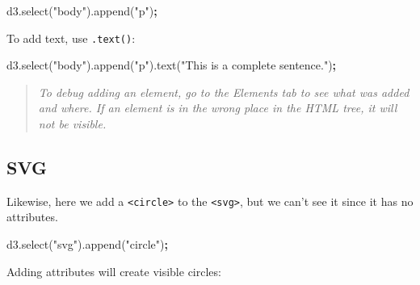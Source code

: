 \documentclass[openany]{book}
\newenvironment{Shaded}{\begin{snugshade}}{\end{snugshade}}
\newcommand{\AttributeTok}[1]{\textcolor[rgb]{0.77,0.63,0.00}{#1}}
\newcommand{\NormalTok}[1]{#1}
\newcommand{\OperatorTok}[1]{\textcolor[rgb]{0.81,0.36,0.00}{\textbf{#1}}}
\newcommand{\StringTok}[1]{\textcolor[rgb]{0.31,0.60,0.02}{#1}}
\newcommand{\VariableTok}[1]{\textcolor[rgb]{0.00,0.00,0.00}{#1}}
\begin{document}
\begin{Shaded}
\begin{Highlighting}[]
\VariableTok{d3}\NormalTok{.}\AttributeTok{select}\NormalTok{(}\StringTok{"body"}\NormalTok{).}\AttributeTok{append}\NormalTok{(}\StringTok{"p"}\NormalTok{)}\OperatorTok{;}
\end{Highlighting}
\end{Shaded}

To add text, use \texttt{.text()}:

\begin{Shaded}
\begin{Highlighting}[]
\VariableTok{d3}\NormalTok{.}\AttributeTok{select}\NormalTok{(}\StringTok{"body"}\NormalTok{).}\AttributeTok{append}\NormalTok{(}\StringTok{"p"}\NormalTok{).}\AttributeTok{text}\NormalTok{(}\StringTok{"This is a complete sentence."}\NormalTok{)}\OperatorTok{;}
\end{Highlighting}
\end{Shaded}

\begin{quote}
 \emph{To debug adding an element, go to the Elements tab to see what was added and where. If an element is in the wrong place in the HTML tree, it will not be visible.}
\end{quote}

\hypertarget{svg-1}{%
\subsection{SVG}\label{svg-1}}

Likewise, here we add a \texttt{\textless{}circle\textgreater{}} to the \texttt{\textless{}svg\textgreater{}}, but we can't see it since it has no attributes.

\begin{Shaded}
\begin{Highlighting}[]
\VariableTok{d3}\NormalTok{.}\AttributeTok{select}\NormalTok{(}\StringTok{"svg"}\NormalTok{).}\AttributeTok{append}\NormalTok{(}\StringTok{"circle"}\NormalTok{)}\OperatorTok{;}
\end{Highlighting}
\end{Shaded}

Adding attributes will create visible circles:
\end{document}
